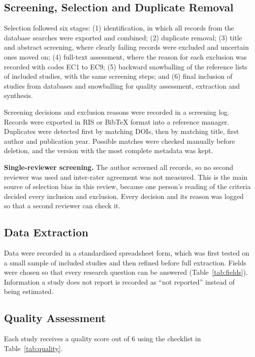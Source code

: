 \documentclass[conference]{IEEEtran}
\begin{document}
\subsection{Screening, Selection and Duplicate Removal}
Selection followed six stages: (1) identification, in which all records from the
database searches were exported and combined; (2) duplicate removal; (3) title
and abstract screening, where clearly failing records were excluded and uncertain
ones moved on; (4) full-text assessment, where the reason for each exclusion was
recorded with codes EC1 to EC9; (5) backward snowballing of the reference lists
of included studies, with the same screening steps; and (6) final inclusion of
studies from databases and snowballing for quality assessment, extraction and
synthesis.

Screening decisions and exclusion reasons were recorded in a screening log.
Records were exported in RIS or BibTeX format into a reference manager.
Duplicates were detected first by matching DOIs, then by matching title, first
author and publication year. Possible matches were checked manually before
deletion, and the version with the most complete metadata was kept.

\noindent\textbf{Single-reviewer screening.} The author screened all records, so no
second reviewer was used and inter-rater agreement was not measured. This is the
main source of selection bias in this review, because one person's reading of the
criteria decided every inclusion and exclusion. Every decision and its reason was
logged so that a second reviewer can check it.

\subsection{Data Extraction}
Data were recorded in a standardised spreadsheet form, which was first tested on
a small sample of included studies and then refined before full extraction.
Fields were chosen so that every research question can be answered
(Table~\ref{tab:fields}). Information a study does not report is recorded as
``not reported'' instead of being estimated.

\subsection{Quality Assessment}
Each study receives a quality score out of 6 using the checklist in
Table~\ref{tab:quality}.
\end{document}
